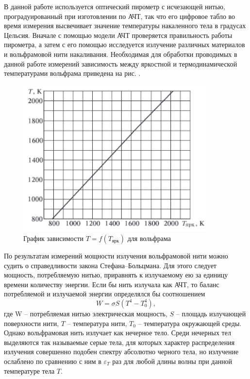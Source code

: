 \documentclass[a4paper,12pt]{article}
\begin{document}
В данной работе используется оптический пирометр с исчезающей нитью, проградуированный при изготовлении по АЧТ, так что его цифровое табло во время измерения высвечивает значение температуры накаленного тела в градусах Цельсия. Вначале с помощью модели АЧТ проверяется правильность работы пирометра, а затем с его помощью исследуется излучение различных материалов и вольфрамовой нити накаливания. Необходимая для обработки проводимых в данной работе измерений зависимость между яркостной и термодинамической температурами вольфрама приведена на рис. .
\begin{figure}[H]\label{fig: T = f(T_br)}
    \centering
    \includegraphics[width = 0.9\textwidth]{T = f(T_br).png}
    \caption{График зависимости $T = f(T_\text{ярк})$ для вольфрама}
\end{figure}

По результатам измерений мощности излучения вольфрамовой нити можно судить о справедливости закона Стефана–Больцмана. Для этого следует мощность, потребляемую нитью, приравнять к излучаемому ею за единицу времени количеству энергии. Если бы нить излучала как АЧТ, то баланс потребляемой и излучаемой энергии определялся бы соотношением
\begin{equation}\label{eq: energy balance BB}
    W = \sigma S(T^4 - T_0^4),
\end{equation}
где W -- потребляемая нитью электрическая мощность, $S$ -- площадь излучающей поверхности нити, $T$ -- температура нити, $T_0$ -- температура окружающей среды. Однако вольфрамовая нить излучает как нечерное тело. Среди нечерных тел выделяются так называемые серые тела, для которых характер распределения излучения совершенно подобен спектру абсолютно черного тела, но излучение ослаблено по сравнению с ним в $\varepsilon_T$ раз для любой длины волны при данной температуре тела $T$.
\end{document}
